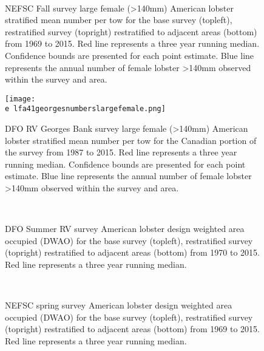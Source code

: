 \documentclass[11pt]{article}
\newcommand{\e}{/backup/bio_data/bio.lobster/figures/} %
\begin{document}
\begin{figure}
\centering
{}
\\
\caption{NEFSC Fall survey large female (\textgreater 140mm) American lobster stratified mean number per tow for the base survey (topleft), restratified survey (topright) restratified to adjacent areas (bottom) from 1969 to 2015. Red line represents a three year running median. Confidence bounds are presented for each point estimate. Blue line represents the annual number of female lobster \textgreater 140mm observed within the survey and area.}
\end{figure}
\clearpage

\begin{figure}

    \texttt{[image: \\e lfa41georgesnumberslargefemale.png]}
    \caption{DFO RV Georges Bank survey large female (\textgreater 140mm) American lobster stratified mean number per tow for the Canadian portion of the survey from 1987 to 2015. Red line represents a three year running median. Confidence bounds are presented for each point estimate. Blue line represents the annual number of female lobster \textgreater 140mm observed within the survey and area.}

\end{figure}


\begin{figure}
\centering
{}
\\
\caption{DFO Summer RV survey American lobster design weighted area occupied (DWAO) for the base survey (topleft), restratified survey (topright) restratified to adjacent areas (bottom) from 1970 to 2015. Red line represents a three year running median.}
\end{figure}
\clearpage


\begin{figure}
\centering
{}
\\
\caption{NEFSC spring survey American lobster design weighted area occupied (DWAO) for the base survey (topleft), restratified survey (topright) restratified to adjacent areas (bottom) from 1969 to 2015. Red line represents a three year running median. }
\end{figure}
\clearpage
\end{document}
